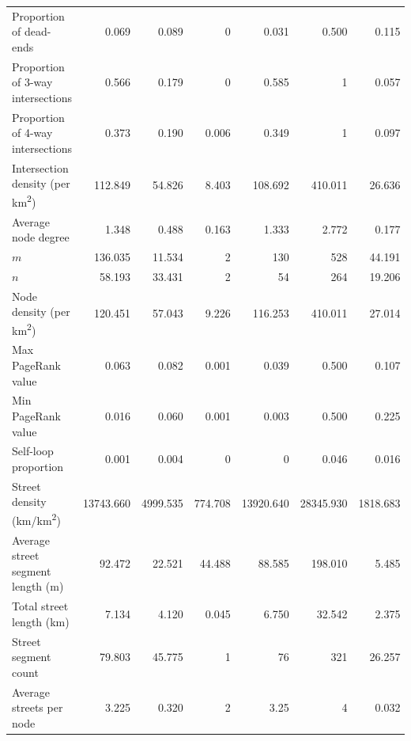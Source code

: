 \begin{table}[htbp]
\begin{tabular}{ l r r r r r r }
		Proportion of dead-ends                          & 0.069          & 0.089          & 0          & 0.031          & 0.500          & 0.115          \\
		Proportion of 3-way intersections                & 0.566          & 0.179          & 0          & 0.585          & 1          & 0.057          \\
		Proportion of 4-way intersections                & 0.373          & 0.190          & 0.006          & 0.349          & 1          & 0.097          \\
		Intersection density (per km\textsuperscript{2}) & 112.849         & 54.826          & 8.403         & 108.692         & 410.011         & 26.636          \\
		Average node degree                              & 1.348          & 0.488          & 0.163          & 1.333          & 2.772          & 0.177          \\
		$m$                                              & 136.035          & 11.534          & 2           & 130          & 528         & 44.191     \\
		$n$                                              & 58.193          & 33.431          & 2            & 54           & 264         & 19.206      \\
		Node density (per km\textsuperscript{2})         & 120.451         & 57.043          & 9.226         & 116.253         & 410.011         & 27.014          \\
		Max PageRank value                               & 0.063          & 0.082          & 0.001 & 0.039          & 0.500          & 0.107 \\
		Min PageRank value                               & 0.016 & 0.060 & 0.001 & 0.003 & 0.500 & 0.225 \\
		Self-loop proportion                             & 0.001          & 0.004          & 0 & 0          & 0.046          & 0.016         \\
		Street density (km/km\textsuperscript{2})        & 13743.660          & 4999.535          & 774.708          & 13920.640          & 28345.930         & 1818.683          \\
		Average street segment length (m)                & 92.472        & 22.521         & 44.488        & 88.585        & 198.010        & 5.485          \\
		Total street length (km)                         & 7.134           & 4.120           & 0.045            & 6.750           & 32.542          & 2.375      \\
		Street segment count                             & 79.803          & 45.775          & 1           & 76           & 321         & 26.257      \\
		Average streets per node                         & 3.225          & 0.320          & 2          & 3.25          & 4          & 0.032          \\
		\bottomrule
	\end{tabular}
\end{table}

